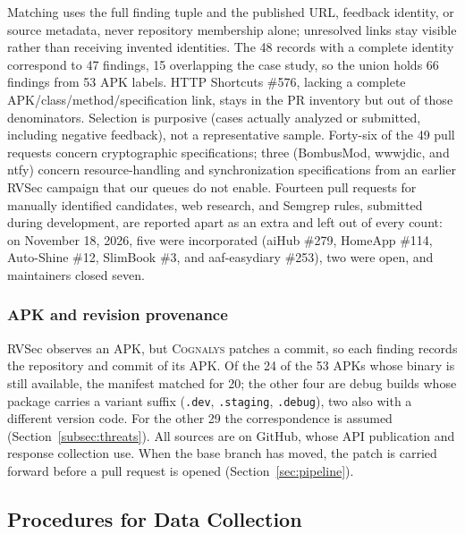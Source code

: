 \documentclass[conference]{IEEEtran}
\newcommand{\system}{\textsc{Cognalys}}
\begin{document}
Matching uses the full finding tuple and the published URL, feedback identity,
or source metadata, never repository membership alone; unresolved links stay
visible rather than receiving invented identities. The 48 records with a
complete identity correspond to 47 findings, 15 overlapping the case study,
so the union holds 66 findings from 53 APK labels. HTTP Shortcuts \#576,
lacking a complete APK/class/method/specification link, stays in the PR
inventory but out of those denominators. Selection is purposive (cases
actually analyzed or submitted, including negative feedback), not a
representative sample. Forty-six of the 49 pull requests concern
cryptographic specifications; three (BombusMod, wwwjdic, and ntfy) concern
resource-handling and synchronization specifications from an earlier RVSec
campaign that our queues do not enable. Fourteen pull requests for manually
identified candidates, web research, and Semgrep rules, submitted during
development, are reported apart as an extra and left out of every count: on
November 18, 2026, five were incorporated (aiHub \#279, HomeApp \#114,
Auto-Shine \#12, SlimBook \#3, and aaf-easydiary \#253), two were open, and
maintainers closed seven.

\subsubsection{APK and revision provenance}

RVSec observes an APK, but \system{} patches a commit, so each finding
records the repository and commit of its APK. Of the 24 of the 53 APKs whose
binary is still available, the manifest matched for 20; the other four are
debug builds whose package carries a variant suffix (\texttt{.dev},
\texttt{.staging}, \texttt{.debug}), two also with a different version code.
For the other 29 the correspondence is assumed
(Section~\ref{subsec:threats}). All sources are on GitHub, whose API
publication and response collection use. When the base branch has moved, the
patch is carried forward before a pull request is opened
(Section~\ref{sec:pipeline}).

\subsection{Procedures for Data Collection}
\label{subsec:collection}
\end{document}
